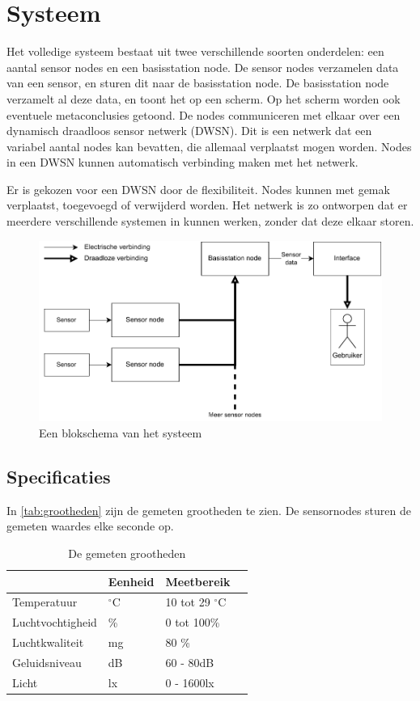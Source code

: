 \section{Systeem}
Het volledige systeem bestaat uit twee verschillende soorten onderdelen: een aantal sensor nodes en een basisstation node.
De sensor nodes verzamelen data van een sensor, en sturen dit naar de basisstation node. De basisstation node verzamelt al deze data, en toont het op een scherm. Op het scherm worden ook eventuele metaconclusies getoond.
De nodes communiceren met elkaar over een dynamisch draadloos sensor netwerk (DWSN).
Dit is een netwerk dat een variabel aantal nodes kan bevatten, die allemaal verplaatst mogen worden. Nodes in een DWSN kunnen automatisch verbinding maken met het netwerk.

Er is gekozen voor een DWSN door de flexibiliteit. Nodes kunnen met gemak verplaatst, toegevoegd of verwijderd worden. Het netwerk is zo ontworpen dat er meerdere verschillende systemen in kunnen werken, zonder dat deze  elkaar storen.

\begin{figure}[ht]
    \centering
    \includegraphics{img/fullsystem.pdf}
    \caption{Een blokschema van het systeem}
    \label{fig:fullsystem}
\end{figure}

\subsection{Specificaties}

In \autoref{tab:grootheden} zijn de gemeten grootheden te zien.
De sensornodes sturen de gemeten waardes elke seconde op. 

\begin{table}[ht]
    \centering
    \begin{tabular}{l||l|l|l}
        & Eenheid & Meetbereik\\
        \hline
        Temperatuur      & $^{\circ}$C & 10 tot 29 $^{\circ}$C & \\
        Luchtvochtigheid & \% & 0 tot 100\% &  \\
        Luchtkwaliteit   & mg & 80 \%       &  \cite{voc-luchtkwaliteit} \\
        Geluidsniveau    & dB & 60 - 80dB   &  \cite{geluid-levels} \\
        Licht            & lx & 0 - 1600lx  & 
    \end{tabular}
    \caption{De gemeten grootheden}
    \label{tab:grootheden}
\end{table}

